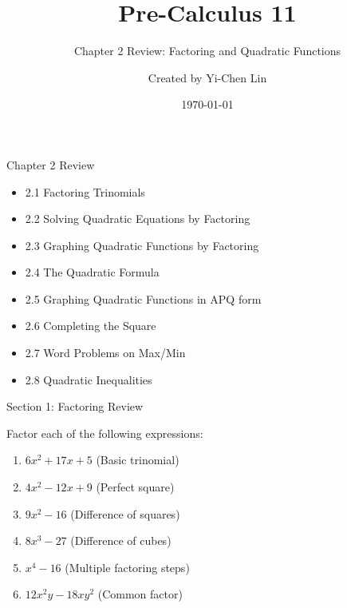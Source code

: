 \documentclass[aspectratio=169]{beamer}
\title{Pre-Calculus 11}
\subtitle{Chapter 2 Review: Factoring and Quadratic Functions}
\author{Created by Yi-Chen Lin}
\date{\today}
\begin{document}
\begin{frame}
    \titlepage
\end{frame}

\begin{frame}{Chapter 2 Review}
    \begin{tcolorbox}[colback=lightgray,colframe=primary,title=Chapter Overview]
        \footnotesize
        \begin{itemize}
            \item 2.1 Factoring Trinomials
            \item 2.2 Solving Quadratic Equations by Factoring
            \item 2.3 Graphing Quadratic Functions by Factoring
            \item 2.4 The Quadratic Formula
            \item 2.5 Graphing Quadratic Functions in APQ form
            \item 2.6 Completing the Square
            \item 2.7 Word Problems on Max/Min
            \item 2.8 Quadratic Inequalities
        \end{itemize}
    \end{tcolorbox}
\end{frame}

\begin{frame}{Section 1: Factoring Review}
    \begin{tcolorbox}[colback=lightgray,colframe=primary,title=Practice Problems]
        \footnotesize
        Factor each of the following expressions:
        \begin{enumerate}
            \setlength{\itemsep}{0.5em}
            \item $6x^2 + 17x + 5$ (Basic trinomial)
            \item $4x^2 - 12x + 9$ (Perfect square)
            \item $9x^2 - 16$ (Difference of squares)
            \item $8x^3 - 27$ (Difference of cubes)
            \item $x^4 - 16$ (Multiple factoring steps)
            \item $12x^2y - 18xy^2$ (Common factor)
        \end{enumerate}
    \end{tcolorbox}
\end{frame}
\end{document}
